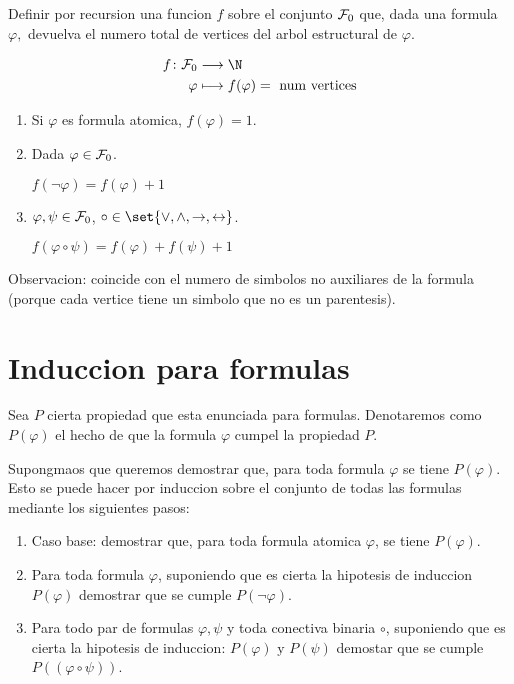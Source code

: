 \begin{example}
	Definir por recursion una funcion \(f \) sobre el conjunto \(\mathcal{\MakeUppercase{f}}_0\) que, dada una formula \(\varphi,\) devuelva el numero total de vertices del arbol estructural de \(\varphi\).

	\[
		\begin{aligned}
			f \colon \mathcal{\MakeUppercase{f}}_0 & \longrightarrow \N                             \\
			\varphi                                & \longmapsto f (\varphi) = \text{ num vertices}
		\end{aligned}
	\]
	\begin{enumerate}
		\item Si \(\varphi\) es formula atomica, \(f(\varphi) = 1 \).
		\item Dada \(\varphi \in \mathcal{\MakeUppercase{f}}_0 \).

		      \(f(\neg \varphi) = f(\varphi) + 1 \)
		\item \(\varphi, \psi \in \mathcal{\MakeUppercase{f}}_0 \), \(\circ \in \set{\vee ,\wedge ,\rightarrow,\leftrightarrow }\).

		      \(f(\varphi \circ \psi) = f(\varphi) + f(\psi) + 1\)
	\end{enumerate}
	Observacion: coincide con el numero de simbolos no auxiliares de la formula (porque cada vertice tiene un simbolo que no es un parentesis).
\end{example}

\section{Induccion para formulas}
\begin{definition}
	Sea \(P \) cierta propiedad que esta enunciada para formulas. Denotaremos como \(P(\varphi)\) el hecho de que la formula \(\varphi\) cumpel la propiedad \(P \).

	Supongmaos que queremos demostrar que, para toda formula \(\varphi\) se tiene \(P(\varphi)\). Esto se puede hacer por induccion sobre el conjunto de todas las formulas mediante los siguientes pasos:
	\begin{enumerate}
		\item Caso base: demostrar que, para toda formula atomica \(\varphi\), se tiene \(P(\varphi)\).
		\item Para toda formula \(\varphi\), suponiendo que es cierta la hipotesis de induccion \(P(\varphi)\) demostrar que se cumple \(P(\neg \varphi)\).
		\item Para todo par de formulas \(\varphi, \psi \) y toda conectiva binaria \(\circ \), suponiendo que es cierta la hipotesis de induccion: \(P(\varphi) \text{ y } P(\psi) \) demostar que se cumple \(P((\varphi \circ \psi))\).
	\end{enumerate}
\end{definition}


